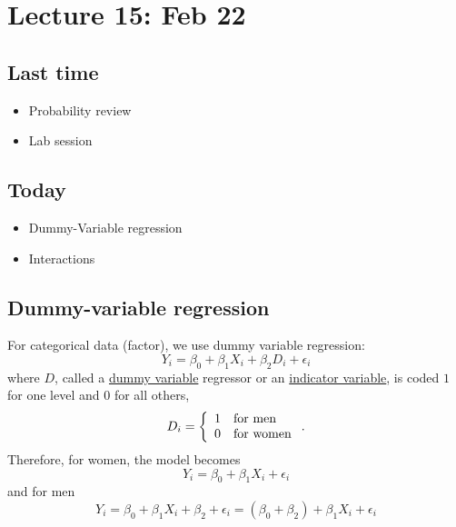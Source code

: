 \setcounter{section}{14}


\section{Lecture 15: Feb 22}


\subsection*{Last time}
\begin{itemize}
  \item Probability review
  \item Lab session
\end{itemize}


\subsection*{Today}
\begin{itemize}
 \item Dummy-Variable regression
 \item Interactions
\end{itemize}

\subsection*{Dummy-variable regression}
For categorical data (factor), we use dummy variable regression:
$$
Y_i = \beta_0 + \beta_1 X_{i} + \beta_2 D_{i} + \epsilon_i
$$
where $D$, called a \underline{dummy variable} regressor or an \underline{indicator variable}, is coded $1$ for one level and $0$ for all others,
$$
D_i = \left\{ \begin{array}{l l} 1 & \mbox{for men}\\ 0 & \mbox{for women}\\ \end{array} \right. .
$$
Therefore, for women, the model becomes
$$
Y_i =\beta_0 + \beta_1 X_{i} + \epsilon_i
$$
and for men
$$
Y_i = \beta_0  + \beta_1 X_{i} + \beta_2 + \epsilon_i = (\beta_0 + \beta_2) + \beta_1 X_{i} + \epsilon_i
$$

